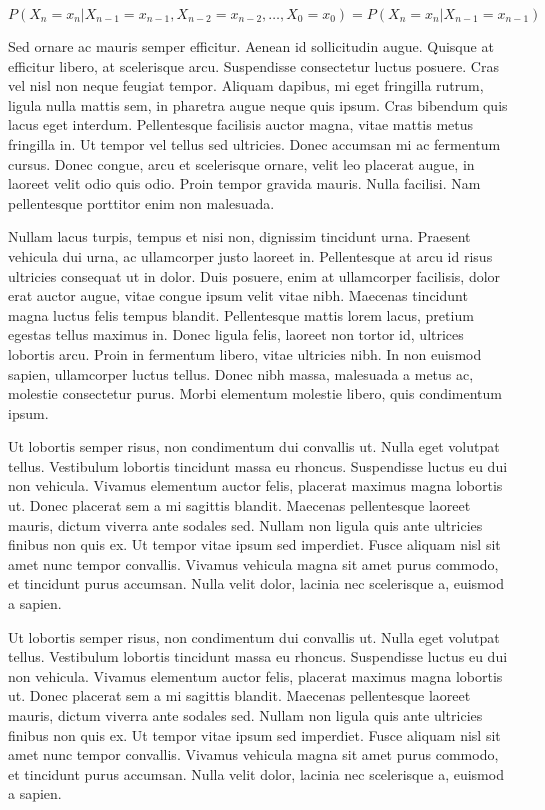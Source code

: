 \documentclass[thesismargins, english, thesislinespacing, twoside, openright, upjsfrontpage]{rnthesis}
\begin{document}
\begin{equation}
P(X_n = x_n | X_{n - 1} = x_{n - 1}, X_{n - 2} = x_{n - 2}, \dots, X_0 = x_0) = P(X_n = x_n | X_{n - 1} = x_{n - 1})
\end{equation}

Sed ornare ac mauris semper efficitur. Aenean id sollicitudin augue. Quisque at efficitur libero, at scelerisque arcu. Suspendisse consectetur luctus posuere. Cras vel nisl non neque feugiat tempor. Aliquam dapibus, mi eget fringilla rutrum, ligula nulla mattis sem, in pharetra augue neque quis ipsum. Cras bibendum quis lacus eget interdum. Pellentesque facilisis auctor magna, vitae mattis metus fringilla in. Ut tempor vel tellus sed ultricies. Donec accumsan mi ac fermentum cursus. Donec congue, arcu et scelerisque ornare, velit leo placerat augue, in laoreet velit odio quis odio. Proin tempor gravida mauris. Nulla facilisi. Nam pellentesque porttitor enim non malesuada.

Nullam lacus turpis, tempus et nisi non, dignissim tincidunt urna. Praesent vehicula dui urna, ac ullamcorper justo laoreet in. Pellentesque at arcu id risus ultricies consequat ut in dolor. Duis posuere, enim at ullamcorper facilisis, dolor erat auctor augue, vitae congue ipsum velit vitae nibh. Maecenas tincidunt magna luctus felis tempus blandit. Pellentesque mattis lorem lacus, pretium egestas tellus maximus in. Donec ligula felis, laoreet non tortor id, ultrices lobortis arcu. Proin in fermentum libero, vitae ultricies nibh. In non euismod sapien, ullamcorper luctus tellus. Donec nibh massa, malesuada a metus ac, molestie consectetur purus. Morbi elementum molestie libero, quis condimentum ipsum.

Ut lobortis semper risus, non condimentum dui convallis ut. Nulla eget volutpat tellus. Vestibulum lobortis tincidunt massa eu rhoncus. Suspendisse luctus eu dui non vehicula. Vivamus elementum auctor felis, placerat maximus magna lobortis ut. Donec placerat sem a mi sagittis blandit. Maecenas pellentesque laoreet mauris, dictum viverra ante sodales sed. Nullam non ligula quis ante ultricies finibus non quis ex. Ut tempor vitae ipsum sed imperdiet. Fusce aliquam nisl sit amet nunc tempor convallis. Vivamus vehicula magna sit amet purus commodo, et tincidunt purus accumsan. Nulla velit dolor, lacinia nec scelerisque a, euismod a sapien. 

\zaver

Ut lobortis semper risus, non condimentum dui convallis ut. Nulla eget volutpat tellus. Vestibulum lobortis tincidunt massa eu rhoncus. Suspendisse luctus eu dui non vehicula. Vivamus elementum auctor felis, placerat maximus magna lobortis ut. Donec placerat sem a mi sagittis blandit. Maecenas pellentesque laoreet mauris, dictum viverra ante sodales sed. Nullam non ligula quis ante ultricies finibus non quis ex. Ut tempor vitae ipsum sed imperdiet. Fusce aliquam nisl sit amet nunc tempor convallis. Vivamus vehicula magna sit amet purus commodo, et tincidunt purus accumsan. Nulla velit dolor, lacinia nec scelerisque a, euismod a sapien. 
%
\end{document}

